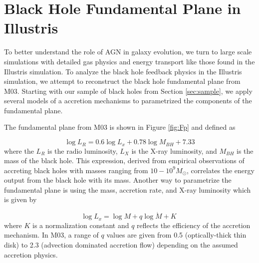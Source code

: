 \section{Black Hole Fundamental Plane in Illustris}
\label{sec:analysis} To better understand the role of AGN in galaxy
evolution, we turn to large scale simulations with detailed gas physics
and energy transport like those found in the Illustris simulation. To analyze the black hole feedback physics in
the Illustris simulation, we attempt to reconstruct the black
hole fundamental plane from M03. Starting with our sample of black
holes from Section \ref{sec:sample}, we apply several models of a
accretion mechanisms to parametrized the components of the fundamental plane.

The fundamental plane from M03
is shown in Figure \ref{fig:Fp} and defined as

\begin{equation}
\log L_{R}=0.6\log L_{x}+0.78\log M_{BH}+7.33
\end{equation}
where the $L_{R}$ is the radio luminosity, $L_{X}$ is the X-ray
luminosity, and $M_{BH}$ is the mass of the black hole. This
expression, derived from empirical observations of accreting black holes with
masses ranging from $10-10^{9}M_{\odot}$, correlates the energy
output from the black hole with its mass. Another way to parametrize
the fundamental plane is using the mass, accretion rate, and X-ray
luminosity which is given by

\begin{equation}
\log L_{x}=\log M+q\log\dot{M}+K\;
\label{eq:LxFP}
\end{equation}
where $K$ is a normalization constant and $q$ reflects the efficiency
of the accretion mechanism. In M03, a range of $q$ values are given 
from 0.5 (optically-thick thin disk) to 2.3 (advection dominated
accretion flow) depending on the assumed accretion physics. 

